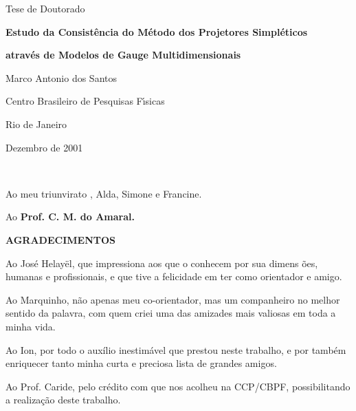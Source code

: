\documentclass[a4paper,thmsa,12pt]{report}
\begin{document}
\label{capa}
\thispagestyle{empty}

\vspace{2.5cm}

\centerline{\large \sc Tese de Doutorado}

\vspace{3cm}

\centerline{\Large \bf Estudo da Consist\^encia do M\'etodo dos Projetores Simpl\'eticos }
\centerline{\Large \bf atrav\'es de Modelos de Gauge Multidimensionais}

\vspace{4cm}

\centerline{\large Marco Antonio dos Santos}

\vspace{6cm}

\centerline{Centro Brasileiro de Pesquisas F\'{\i}sicas}

\bigskip

\centerline{Rio de Janeiro}

\bigskip

\centerline{Dezembro de 2001}%

\newpage
\thispagestyle{empty}

~\vspace{18cm}

\hspace{5cm} Ao meu triunvirato , Alda, Simone e Francine.

\bigskip\bigskip

\hspace{5cm} Ao {\bf Prof. C. M. do Amaral.}

\newpage

\thispagestyle{empty}
\centerline{\bf AGRADECIMENTOS}

\bigskip

Ao  Jos\'{e}  Helay\"{e}l, que impressiona aos que o conhecem por sua dimens%
\~{o}es, humanas e profissionais, e que tive a felicidade em ter como
orientador e amigo.

Ao  Marquinho, n\~{a}o apenas meu co-orientador, mas um companheiro no
melhor sentido da palavra, com quem criei uma das amizades mais valiosas em
toda a minha vida.

Ao Ion, por todo o aux\'{i}lio inestim\'{a}vel que prestou neste trabalho, e
por tamb\'{e}m enriquecer tanto minha curta e preciosa lista de grandes
amigos.

Ao Prof. Caride, pelo cr\'{e}dito com que nos acolheu na CCP/CBPF,
possibilitando a realiza\c{c}\~{a}o deste trabalho.
\end{document}
